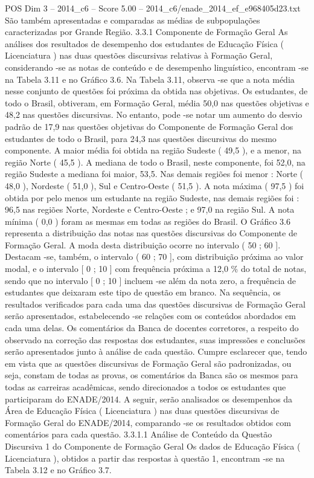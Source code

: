\begin{textsample}{POS Dim 3 – 2014\_c6 – Score 5.00 – 2014\_c6/enade\_2014\_ef\_e968405d23.txt}
São também apresentadas e comparadas as médias de subpopulações caracterizadas por Grande Região. 3.3.1 Componente de Formação Geral As análises dos resultados de desempenho dos estudantes de Educação Física ( Licenciatura ) nas duas questões discursivas relativas à Formação Geral, considerando -se as notas de conteúdo e de desempenho linguístico, encontram -se na Tabela 3.11 e no Gráfico 3.6.
Na Tabela 3.11, observa -se que a nota média nesse conjunto de questões foi próxima da obtida nas objetivas.
Os estudantes, de todo o Brasil, obtiveram, em Formação Geral, média 50,0 nas questões objetivas e 48,2 nas questões discursivas.
No entanto, pode -se notar um aumento do desvio padrão de 17,9 nas questões objetivas do Componente de Formação Geral dos estudantes de todo o Brasil, para 24,3 nas questões discursivas do mesmo componente.
A maior média foi obtida na região Sudeste ( 49,5 ), e a menor, na região Norte ( 45,5 ).
A mediana de todo o Brasil, neste componente, foi 52,0, na região Sudeste a mediana foi maior, 53,5.
Nas demais regiões foi menor : Norte ( 48,0 ), Nordeste ( 51,0 ), Sul e Centro-Oeste ( 51,5 ).
A nota máxima ( 97,5 ) foi obtida por pelo menos um estudante na região Sudeste, nas demais regiões foi : 96,5 nas regiões Norte, Nordeste e Centro-Oeste ; e 97,0 na região Sul.
A nota mínima ( 0,0 ) foram as mesmas em todas as regiões do Brasil.
O Gráfico 3.6 representa a distribuição das notas nas questões discursivas do Componente de Formação Geral.
A moda desta distribuição ocorre no intervalo ( 50 ; 60 ].
Destacam -se, também, o intervalo ( 60 ; 70 ], com distribuição próxima ao valor modal, e o intervalo [ 0 ; 10 ] com frequência próxima a 12,0 \% do total de notas, sendo que no intervalo [ 0 ; 10 ] incluem -se além da nota zero, a frequência de estudantes que deixaram este tipo de questão em branco.
Na sequência, os resultados verificados para cada uma das questões discursivas de Formação Geral serão apresentados, estabelecendo -se relações com os conteúdos abordados em cada uma delas.
Os comentários da Banca de docentes corretores, a respeito do observado na correção das respostas dos estudantes, suas impressões e conclusões serão apresentados junto à análise de cada questão.
Cumpre esclarecer que, tendo em vista que as questões discursivas de Formação Geral são padronizadas, ou seja, constam de todas as provas, os comentários da Banca são os mesmos para todas as carreiras acadêmicas, sendo direcionados a todos os estudantes que participaram do ENADE/2014.
A seguir, serão analisados os desempenhos da Área de Educação Física ( Licenciatura ) nas duas questões discursivas de Formação Geral do ENADE/2014, comparando -se os resultados obtidos com comentários para cada questão. 3.3.1.1 Análise de Conteúdo da Questão Discursiva 1 do Componente de Formação Geral Os dados de Educação Física ( Licenciatura ), obtidos a partir das respostas à questão 1, encontram -se na Tabela 3.12 e no Gráfico 3.7.

\end{textsample}
